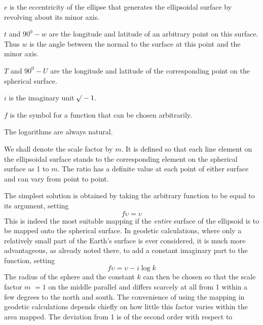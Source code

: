\begin{list}{}{\setlength{\leftmargin}{1.5em}\setlength{\itemindent}{-1.5em}\setlength{\itemsep}{0pt}\setlength{\parsep}{0pt}}
\item \(e\) is the eccentricity of the ellipse that generates the ellipsoidal surface by revolving about its minor axis.
\item \(t\) and \(90^0-w\) are the longitude and latitude of an arbitrary point on this surface. Thus \(w\) is the angle between the normal to the surface at this point and the minor axis.
\item \(T\) and \(90^0-U\) are the longitude and latitude of the corresponding point on the spherical surface.
\item \(i\) is the imaginary unit \(\mathord{{}^{}\!\surd}-1\).
\item \(f\) is the symbol for a function that can be chosen arbitrarily.
\end{list}
\noindent The logarithms are always natural.\par
\noindent We shall denote the scale factor by \(m\). It is defined so that each line element on the ellipsoidal surface stands to the corresponding element on the spherical surface as 1 to \(m\). The ratio has a definite value at each point of either surface and can vary from point to point.

The simplest solution is obtained by taking the arbitrary function to be equal to its argument, setting
\[
f\upsilon=\upsilon
\]
This is indeed the most suitable mapping if the \textit{entire} surface of the ellipsoid is to be mapped onto the spherical surface. In geodetic calculations, where only a relatively small part of the Earth’s surface is ever considered, it is much more advantageous, as already noted there, to add a constant imaginary part to the function, setting
\[
f\upsilon=\upsilon-i\log k
\]
The radius of the sphere and the constant \(k\) can then be chosen so that the scale factor \(m\) \(=1\) on the middle parallel and differs scarcely at all from 1 within a few degrees to the north and south. The convenience of using the mapping in geodetic calculations depends chiefly on how little this factor varies within the area mapped. The deviation from 1 is of the second order with respect to
